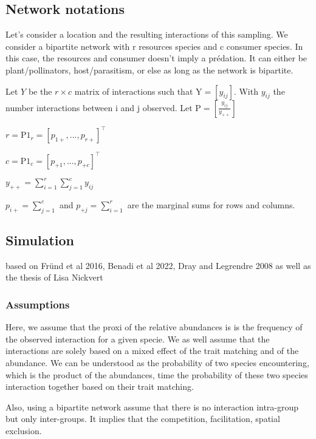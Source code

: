 \documentclass{article}
\begin{document}
\subsection{Network notations}
Let's consider a location and the resulting interactions of this sampling. We consider a bipartite network with r resources species and c consumer species. In this case, the resources and consumer doesn't imply a prédation. It can either be plant/pollinators, host/parasitism, or else as long as the network is bipartite. 

Let $Y$ be the $r\times c$ matrix of interactions such that $\textrm{Y} = [y_{ij}]$. With $y_{ij}$ the number interactions between i and j observed.
Let $\textrm{P}=[\frac{y_{ij}}{y_{++}}]$

$r=\textrm{P1}_r =[p_{1+}, ..., p_{r+}]^\intercal$

$c=\textrm{P1}_c=[p_{+1}, ..., p_{+c}]^\intercal$

$y_{++}=\sum_{i=1}^{r}\sum_{j=1}^{c}y_{ij}$

$p_{i+}=\sum_{j=1}^{c}$ and $p_{+j}=\sum_{i=1}^{r}$ are the marginal sums for rows and columns.














\subsection{Simulation}

based on Fründ et al 2016, Benadi et al 2022, Dray and Legrendre 2008 as well as the thesis of Lisa Nickvert

\subsubsection{Assumptions}
Here, we assume that the proxi of the relative abundances is is the frequency of the observed interaction for a given specie. We as well assume that the interactions are solely based on a mixed effect of the trait matching and of the abundance. We can be understood as the probability of two species encountering, which is the product of the abundances, time the probability of these two species interaction together based on their trait matching.

Also, using a bipartite network assume that there is no interaction intra-group but only inter-groups. It implies that the competition, facilitation, spatial exclusion.
\end{document}
